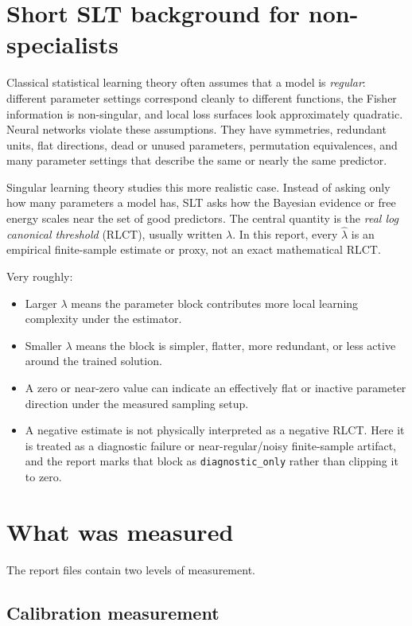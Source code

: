 \documentclass[11pt]{article}
\begin{document}
\section{Short SLT background for non-specialists}

Classical statistical learning theory often assumes that a model is
\emph{regular}: different parameter settings correspond cleanly to different
functions, the Fisher information is non-singular, and local loss surfaces look
approximately quadratic. Neural networks violate these assumptions. They have
symmetries, redundant units, flat directions, dead or unused parameters,
permutation equivalences, and many parameter settings that describe the same or
nearly the same predictor.

Singular learning theory studies this more realistic case. Instead of asking
only how many parameters a model has, SLT asks how the Bayesian evidence or free
energy scales near the set of good predictors. The central quantity is the
\emph{real log canonical threshold} (RLCT), usually written \(\lambda\). In this
report, every \(\hat\lambda\) is an empirical finite-sample estimate or proxy,
not an exact mathematical RLCT.

Very roughly:
\begin{itemize}[leftmargin=*]
\item Larger \(\lambda\) means the parameter block contributes more local
learning complexity under the estimator.
\item Smaller \(\lambda\) means the block is simpler, flatter, more redundant,
or less active around the trained solution.
\item A zero or near-zero value can indicate an effectively flat or inactive
parameter direction under the measured sampling setup.
\item A negative estimate is not physically interpreted as a negative RLCT.
Here it is treated as a diagnostic failure or near-regular/noisy finite-sample
artifact, and the report marks that block as \texttt{diagnostic\_only} rather
than clipping it to zero.
\end{itemize}

\section{What was measured}

The report files contain two levels of measurement.

\subsection{Calibration measurement}
\end{document}
